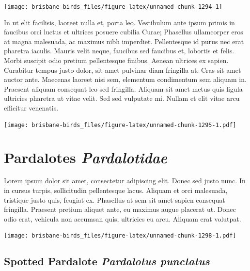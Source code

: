 \documentclass[]{book}
\let\origfigure\figure
\let\endorigfigure\endfigure
\renewenvironment{figure}[1][2] {
  \expandafter\origfigure\expandafter[H]
} {
  \endorigfigure
}
\begin{document}
\begin{figure}
\texttt{[image: brisbane-birds\_files/figure-latex/unnamed-chunk-1294-1]} \caption{insert figure caption}\label{fig:unnamed-chunk-1294}
\end{figure}

In ut elit facilisis, laoreet nulla et, porta leo. Vestibulum ante ipsum
primis in faucibus orci luctus et ultrices posuere cubilia Curae;
Phasellus ullamcorper eros at magna malesuada, ac maximus nibh
imperdiet. Pellentesque id purus nec erat pharetra iaculis. Mauris velit
neque, faucibus sed faucibus et, lobortis et felis. Morbi suscipit odio
pretium pellentesque finibus. Aenean ultrices ex sapien. Curabitur
tempus justo dolor, sit amet pulvinar diam fringilla at. Cras sit amet
auctor ante. Maecenas laoreet nisi sem, elementum condimentum sem
aliquam in. Praesent aliquam consequat leo sed fringilla. Aliquam sit
amet metus quis ligula ultricies pharetra ut vitae velit. Sed sed
vulputate mi. Nullam et elit vitae arcu efficitur venenatis.

\begin{figure}
\centering
\texttt{[image: brisbane-birds\_files/figure-latex/unnamed-chunk-1295-1.pdf]}
\caption{\label{fig:unnamed-chunk-1295}insert figure caption}
\end{figure}

\chapter{\texorpdfstring{Pardalotes
\emph{Pardalotidae}}{Pardalotes Pardalotidae}}\label{pardalotes-pardalotidae}

Lorem ipsum dolor sit amet, consectetur adipiscing elit. Donec sed justo
nunc. In in cursus turpis, sollicitudin pellentesque lacus. Aliquam et
orci malesuada, tristique justo quis, feugiat ex. Phasellus at sem sit
amet sapien consequat fringilla. Praesent pretium aliquet ante, eu
maximus augue placerat ut. Donec odio erat, vehicula non accumsan quis,
ultricies eu arcu. Aliquam erat volutpat.

\texttt{[image: brisbane-birds\_files/figure-latex/unnamed-chunk-1298-1.pdf]}

\section{\texorpdfstring{Spotted Pardalote \emph{Pardalotus
punctatus}}{Spotted Pardalote Pardalotus punctatus}}\label{spotted-pardalote-pardalotus-punctatus}
\end{document}
